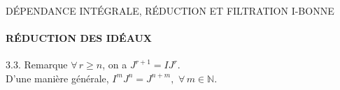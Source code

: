 \documentclass[11pt,a4paper]{beamer}
\begin{document}
\begin{frame}{DÉPENDANCE INTÉGRALE, RÉDUCTION ET FILTRATION I-BONNE}
	\framesubtitle{RÉDUCTION DES IDÉAUX}
	\begin{alertblock}{3.3. Remarque}
	$\forall \, r\geq n$, on a $J^{r+1} = IJ^{r}$.\\
D'une manière générale, $I^{m}J^{n}=J^{n+m}, \, \, \forall \, m\in \mathbb{N}$.	
	\end{alertblock}
\end{frame}

\end{document}
